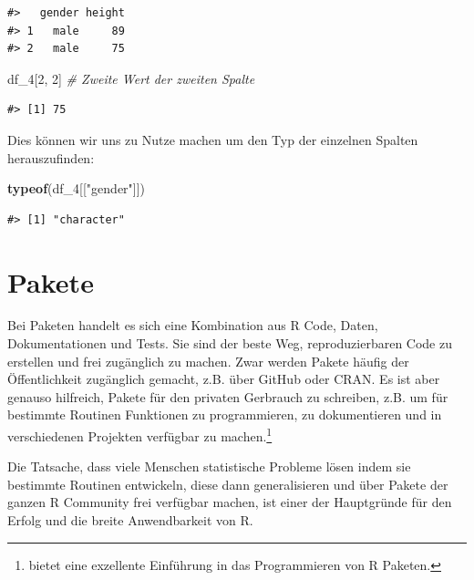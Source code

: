 \documentclass[]{book}
\newenvironment{Shaded}{\begin{snugshade}}{\end{snugshade}}
\newcommand{\KeywordTok}[1]{\textcolor[rgb]{0.13,0.29,0.53}{\textbf{#1}}}
\newcommand{\DecValTok}[1]{\textcolor[rgb]{0.00,0.00,0.81}{#1}}
\newcommand{\StringTok}[1]{\textcolor[rgb]{0.31,0.60,0.02}{#1}}
\newcommand{\CommentTok}[1]{\textcolor[rgb]{0.56,0.35,0.01}{\textit{#1}}}
\newcommand{\NormalTok}[1]{#1}
\let\rmarkdownfootnote\footnote%
\def\footnote{\protect\rmarkdownfootnote}
\begin{document}
\begin{verbatim}
#>   gender height
#> 1   male     89
#> 2   male     75
\end{verbatim}

\begin{Shaded}
\begin{Highlighting}[]
\NormalTok{df_}\DecValTok{4}\NormalTok{[}\DecValTok{2}\NormalTok{, }\DecValTok{2}\NormalTok{] }\CommentTok{# Zweite Wert der zweiten Spalte}
\end{Highlighting}
\end{Shaded}

\begin{verbatim}
#> [1] 75
\end{verbatim}

Dies können wir uns zu Nutze machen um den Typ der einzelnen Spalten
herauszufinden:

\begin{Shaded}
\begin{Highlighting}[]
\KeywordTok{typeof}\NormalTok{(df_}\DecValTok{4}\NormalTok{[[}\StringTok{"gender"}\NormalTok{]])}
\end{Highlighting}
\end{Shaded}

\begin{verbatim}
#> [1] "character"
\end{verbatim}

\section{Pakete}\label{pakete}

Bei Paketen handelt es sich eine Kombination aus R Code, Daten,
Dokumentationen und Tests. Sie sind der beste Weg, reproduzierbaren Code
zu erstellen und frei zugänglich zu machen. Zwar werden Pakete häufig
der Öffentlichkeit zugänglich gemacht, z.B. über GitHub oder CRAN. Es
ist aber genauso hilfreich, Pakete für den privaten Gerbrauch zu
schreiben, z.B. um für bestimmte Routinen Funktionen zu programmieren,
zu dokumentieren und in verschiedenen Projekten verfügbar zu
machen.\footnote{\citet{Packages} bietet eine exzellente Einführung in
  das Programmieren von R Paketen.}

Die Tatsache, dass viele Menschen statistische Probleme lösen indem sie
bestimmte Routinen entwickeln, diese dann generalisieren und über Pakete
der ganzen R Community frei verfügbar machen, ist einer der Hauptgründe
für den Erfolg und die breite Anwendbarkeit von R.
\end{document}
